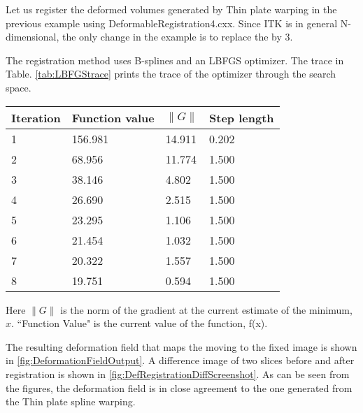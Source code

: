 %
%
%
%
%
%
Let us register the deformed volumes generated by Thin plate warping in the
previous example using DeformableRegistration4.cxx. Since ITK is in general
N-dimensional, the only change in the example is to replace the
 by 3.

The registration method uses B-splines and an LBFGS optimizer. The trace in
Table. \ref{tab:LBFGStrace} prints the trace of the optimizer through the
search space.

\begin{table}
\begin{center}
\begin{tabular}{ | p{3cm} | p{1.8cm} | p{2.5cm} | p{4cm} | }
\hline
\textbf{Iteration} &
\textbf{Function value} &
\textbf{$\|G\|$} &
\textbf{Step length} \\
\hline\hline
   1    &        156.981  &    14.911  & 0.202 \\
   2    &        68.956    &    11.774    &    1.500 \\
   3    &        38.146    &    4.802     &   1.500 \\
   4    &        26.690    &    2.515     &   1.500 \\
   5    &        23.295    &    1.106     &   1.500\\
   6    &        21.454    &    1.032     &   1.500\\
   7    &        20.322    &    1.557     &   1.500\\
   8    &        19.751    &    0.594     &   1.500\\
\hline
\end{tabular}
\end{center}
\end{table}

Here $\|G\|$ is the norm of the gradient at the current estimate of the
minimum, $x$. ``Function Value" is the current value of the function, f(x).

The resulting deformation field that maps the moving to the fixed image is
shown in \ref{fig:DeformationFieldOutput}. A difference image of two slices
before and after registration is shown in
\ref{fig:DefRegistrationDiffScreenshot}. As can be seen from the figures, the
deformation field is in close agreement to the one generated from the Thin
plate spline warping.

